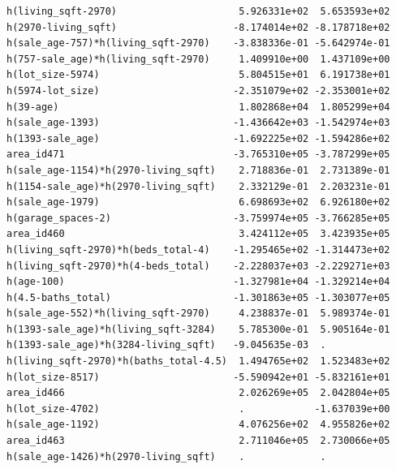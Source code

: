 \documentclass[
]{article}
\begin{document}
\begin{verbatim}
h(living_sqft-2970)                     5.926331e+02  5.653593e+02
h(2970-living_sqft)                    -8.174014e+02 -8.178718e+02
h(sale_age-757)*h(living_sqft-2970)    -3.838336e-01 -5.642974e-01
h(757-sale_age)*h(living_sqft-2970)     1.409910e+00  1.437109e+00
h(lot_size-5974)                        5.804515e+01  6.191738e+01
h(5974-lot_size)                       -2.351079e+02 -2.353001e+02
h(39-age)                               1.802868e+04  1.805299e+04
h(sale_age-1393)                       -1.436642e+03 -1.542974e+03
h(1393-sale_age)                       -1.692225e+02 -1.594286e+02
area_id471                             -3.765310e+05 -3.787299e+05
h(sale_age-1154)*h(2970-living_sqft)    2.718836e-01  2.731389e-01
h(1154-sale_age)*h(2970-living_sqft)    2.332129e-01  2.203231e-01
h(sale_age-1979)                        6.698693e+02  6.926180e+02
h(garage_spaces-2)                     -3.759974e+05 -3.766285e+05
area_id460                              3.424112e+05  3.423935e+05
h(living_sqft-2970)*h(beds_total-4)    -1.295465e+02 -1.314473e+02
h(living_sqft-2970)*h(4-beds_total)    -2.228037e+03 -2.229271e+03
h(age-100)                             -1.327981e+04 -1.329214e+04
h(4.5-baths_total)                     -1.301863e+05 -1.303077e+05
h(sale_age-552)*h(living_sqft-2970)     4.238837e-01  5.989374e-01
h(1393-sale_age)*h(living_sqft-3284)    5.785300e-01  5.905164e-01
h(1393-sale_age)*h(3284-living_sqft)   -9.045635e-03  .           
h(living_sqft-2970)*h(baths_total-4.5)  1.494765e+02  1.523483e+02
h(lot_size-8517)                       -5.590942e+01 -5.832161e+01
area_id466                              2.026269e+05  2.042804e+05
h(lot_size-4702)                        .            -1.637039e+00
h(sale_age-1192)                        4.076256e+02  4.955826e+02
area_id463                              2.711046e+05  2.730066e+05
h(sale_age-1426)*h(2970-living_sqft)    .             .           
                                                                  

\end{verbatim}
\end{document}
